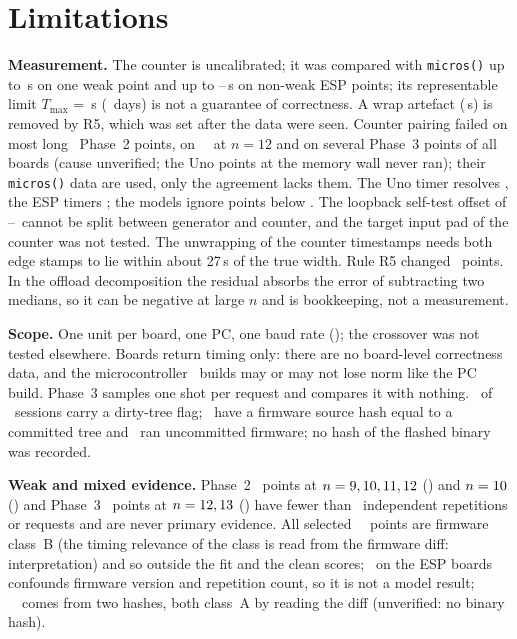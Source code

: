 \section{Limitations}\label{sec:limits}
\textbf{Measurement.} The counter is uncalibrated; it was compared with \texttt{micros()} up to \EspHiLongest\,s on one weak point and up to \RatioLongSEspHi--\RatioLongSEspLo\,s on non-weak ESP points; its representable limit $T_{\max}$ = \TMaxS\,s (\TMaxDays\ days) is not a guarantee of correctness. A wrap artefact (\WrapS\,s) is removed by R5, which was set after the data were seen. Counter pairing failed on most long \espA\ Phase~2 points, on \espB\ \grover\ at $n=12$ and on several Phase~3 points of all boards (cause unverified; the Uno points at the memory wall never ran); their \texttt{micros()} data are used, only the agreement lacks them. The Uno timer resolves \UnoResUs\us, the ESP timers \EspResUs\us; the models ignore points below \ModelFloorUs\us. The loopback self-test offset of \SelfTestLo--\SelfTestHi\us\ cannot be split between generator and counter, and the target input pad of the counter was not tested. The unwrapping of the counter timestamps needs both edge stamps to lie within about 27\,s of the true width. Rule R5 changed \RFivePoints\ points. In the offload decomposition the residual absorbs the error of subtracting two medians, so it can be negative at large $n$ and is bookkeeping, not a measurement.

\textbf{Scope.} One unit per board, one PC, one baud rate (\BaudSp); the crossover was not tested elsewhere. Boards return timing only: there are no board-level correctness data, and the microcontroller \grover\ builds may or may not lose norm like the PC build. Phase~3 samples one shot per request and compares it with nothing. \ProvDirty\ of \NSessions\ sessions carry a dirty-tree flag; \ProvCommitted\ have a firmware source hash equal to a committed tree and \ProvUncommitted\ ran uncommitted firmware; no hash of the flashed binary was recorded.

\textbf{Weak and mixed evidence.} Phase~2 \grover\ points at $n=9,10,11,12$ (\espB) and $n=10$ (\espA) and Phase~3 \grover\ points at $n=12,13$ (\espB) have fewer than \WeakMin\ independent repetitions or requests and are never primary evidence. All selected \espA\ \grover\ points are firmware class~B (the timing relevance of the class is read from the firmware diff: interpretation) and so outside the fit and the clean scores; \grover\ on the ESP boards confounds firmware version and repetition count, so it is not a model result; \espB\ \grover\ comes from two hashes, both class~A by reading the diff (unverified: no binary hash).


